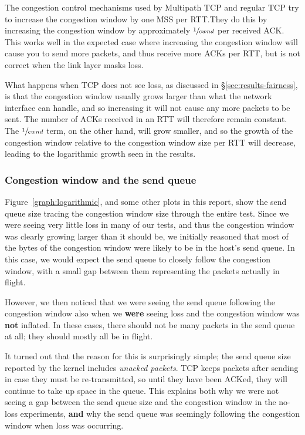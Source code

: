 The congestion control mechanisms used by Multipath TCP and regular TCP try to
increase the congestion window by one MSS per RTT.\@ They do this by increasing
the congestion window by approximately $\sfrac{1}{cwnd}$ per received ACK.\@
This works well in the expected case where increasing the congestion window will
cause you to send more packets, and thus receive more ACKs per RTT, but is not
correct when the link layer masks loss.

What happens when TCP does not see loss, as discussed in \S\ref{sec:results-fairness}, 
is that the congestion window usually grows larger than what the network 
interface can handle, and so increasing it will not cause any more packets to be 
sent. The number of ACKs received in an RTT will therefore remain constant. The 
$\sfrac{1}{cwnd}$ term, on the other hand, will grow smaller, and so the growth of the 
congestion window relative to the congestion window size per RTT will decrease, 
leading to the logarithmic growth seen in the results.

\subsubsection{Congestion window and the send queue}
\label{sec:closing:sendq}
Figure~\ref{graph:logarithmic}, and some other plots in this report, show the
send queue size tracing the congestion window size through the entire test.
Since we were seeing very little loss in many of our tests, and thus the
congestion window was clearly growing larger than it should be, we initially
reasoned that most of the bytes of the congestion window were likely to be in
the host's send queue. In this case, we would expect the send queue to closely
follow the congestion window, with a small gap between them representing the
packets actually in flight.

However, we then noticed that we were seeing the send queue following the
congestion window also when we \textbf{were} seeing loss and the congestion
window was \textbf{not} inflated. In these cases, there should not be many
packets in the send queue at all; they should mostly all be in flight.

It turned out that the reason for this is surprisingly simple; the send queue
size reported by the kernel includes \textit{unacked packets}. TCP keeps packets
after sending in case they must be re-transmitted, so until they have been
ACKed, they will continue to take up space in the queue. This explains both why
we were not seeing a gap between the send queue size and the congestion window
in the no-loss experiments, \textbf{and} why the send queue was seemingly
following the congestion window when loss was occurring.

